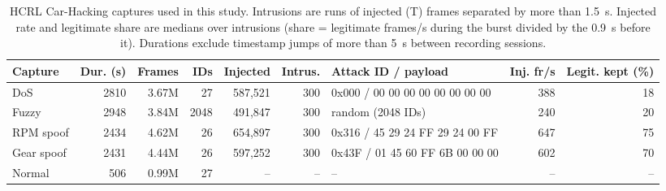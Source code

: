 \begin{table}[t]
\centering
\footnotesize
\caption{HCRL Car-Hacking captures used in this study. Intrusions are runs of injected (T) frames separated by more than 1.5~s. Injected rate and legitimate share are medians over intrusions (share = legitimate frames/s during the burst divided by the 0.9~s before it). Durations exclude timestamp jumps of more than 5~s between recording sessions.}
\label{tab:hcrl_dataset}
\begin{tabular}{lrrrrrlrr}
\toprule
Capture & Dur. (s) & Frames & IDs & Injected & Intrus. & Attack ID / payload & Inj. fr/s & Legit. kept (\%) \\
\midrule
DoS & 2810 & 3.67M & 27 & 587,521 & 300 & 0x000 / 00 00 00 00 00 00 00 00 & 388 & 18 \\
Fuzzy & 2948 & 3.84M & 2048 & 491,847 & 300 & random (2048 IDs) & 240 & 20 \\
RPM spoof & 2434 & 4.62M & 26 & 654,897 & 300 & 0x316 / 45 29 24 FF 29 24 00 FF & 647 & 75 \\
Gear spoof & 2431 & 4.44M & 26 & 597,252 & 300 & 0x43F / 01 45 60 FF 6B 00 00 00 & 602 & 70 \\
Normal & 506 & 0.99M & 27 & -- & -- & -- & -- & -- \\
\bottomrule
\end{tabular}
\end{table}
